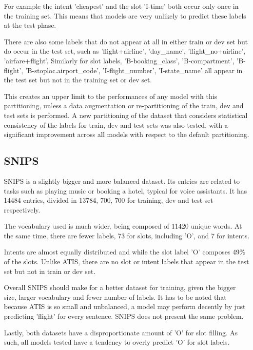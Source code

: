 \documentclass[a4paper]{article}
\begin{document}
For example the intent 'cheapest' and the slot 'I-time' both occur only once in the training set. This means that models are very unlikely to predict these labels at the test phase. 

There are also some labels that do not appear at all in either train or dev set but do occur in the test set, such as 'flight+airline', 'day\_name', 'flight\_no+airline', 'airfare+flight'. 
Similarly for slot labels, 'B-booking\_class', 'B-compartment', 'B-flight', 'B-stoploc.airport\_code', 'I-flight\_number', 'I-state\_name' all appear in the test set but not in the training set or dev set.

This creates an upper limit to the performances of any model with this partitioning, unless a data augmentation or re-partitioning of the train, dev and test sets is performed. A new partitioning of the dataset that considers statistical consistency of the labels for train, dev and test sets was also tested, with a significant improvement across all models with respect to the default partitioning.

\subsection{SNIPS}
SNIPS is a slightly bigger and more balanced dataset. Its entries are related to tasks such as playing music or booking a hotel, typical for voice assistants. It has 14484 entries, divided in 13784, 700, 700 for training, dev and test set respectively. 

The vocabulary used is much wider, being composed of 11420 unique words. At the same time, there are fewer labels, 73 for slots, including 'O', and 7 for intents. 

Intents are almost equally distributed and while the slot label 'O' composes 49\% of the slots. Unlike ATIS, there are no slot or intent labels that appear in the test set but not in train or dev set. 


Overall SNIPS should make for a better dataset for training, given the bigger size, larger vocabulary and fewer number of labels. It has to be noted that because ATIS is so small and unbalanced, a model may perform decently by just predicting 'flight' for every sentence. SNIPS does not present the same problem.


Lastly, both datasets have a disproportionate amount of 'O' for slot filling. As such, all models tested have a tendency to overly predict 'O' for slot labels.

\end{document}
